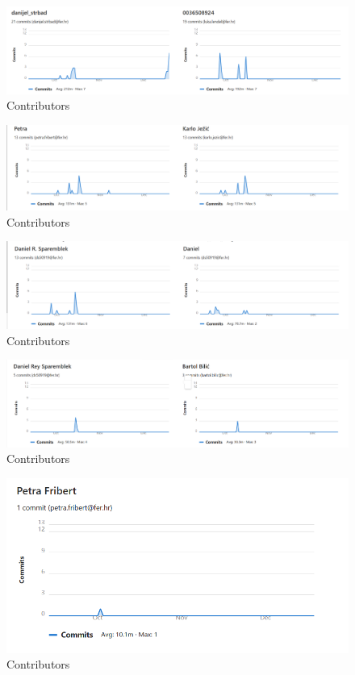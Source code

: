 		\begin{figure}[H]
			\includegraphics[width=\linewidth]{images/contribs_3.png}
			\caption{Contributors}
			\label{fig:contribs_3}
		\end{figure}

		\begin{figure}[H]
			\includegraphics[width=\linewidth]{images/contribs_4.png}
			\caption{Contributors}
			\label{fig:contribs_4}
		\end{figure}

		\begin{figure}[H]
			\includegraphics[width=\linewidth]{images/contribs_5.png}
			\caption{Contributors}
			\label{fig:contribs_5}
		\end{figure}

		\begin{figure}[H]
			\includegraphics[width=\linewidth]{images/contribs_6.png}
			\caption{Contributors}
			\label{fig:contribs_6}
		\end{figure}

		\begin{figure}[H]
			\includegraphics[width=\linewidth]{images/contribs_7.png}
			\caption{Contributors}
			\label{fig:contribs_7}
		\end{figure}
		
	